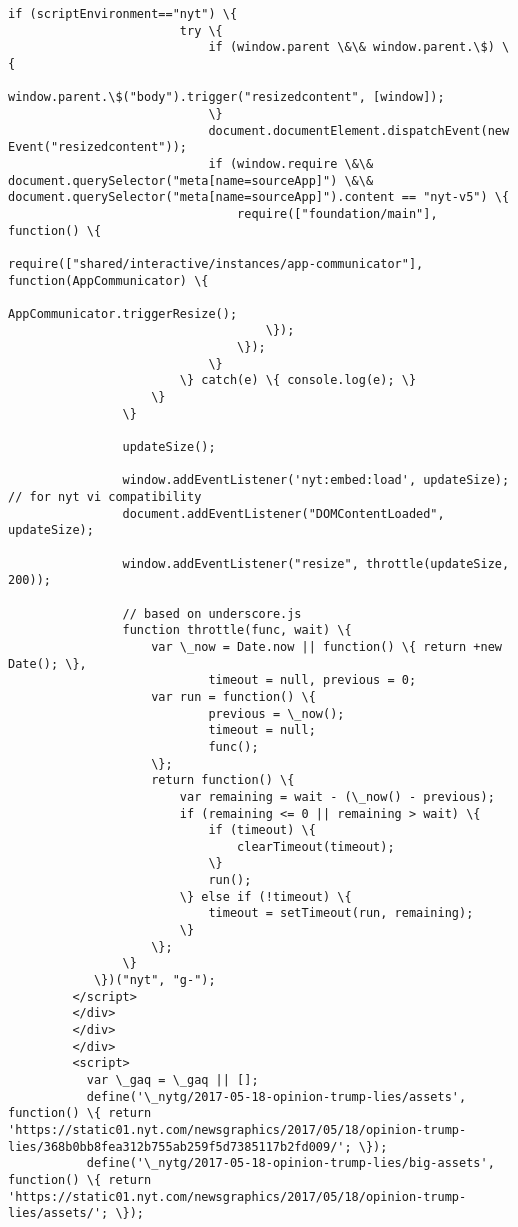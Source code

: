 \documentclass[11pt]{article}
\begin{document}
\begin{Verbatim}[commandchars=\\\{\}]
         			if (scriptEnvironment=="nyt") \{
         				try \{
         					if (window.parent \&\& window.parent.\$) \{
         						window.parent.\$("body").trigger("resizedcontent", [window]);
         					\}
         					document.documentElement.dispatchEvent(new Event("resizedcontent"));
         					if (window.require \&\& document.querySelector("meta[name=sourceApp]") \&\& document.querySelector("meta[name=sourceApp]").content == "nyt-v5") \{
         						require(["foundation/main"], function() \{
         							require(["shared/interactive/instances/app-communicator"], function(AppCommunicator) \{
         								AppCommunicator.triggerResize();
         							\});
         						\});
         					\}
         				\} catch(e) \{ console.log(e); \}
         			\}
         		\}
         
         		updateSize();
         
         		window.addEventListener('nyt:embed:load', updateSize); // for nyt vi compatibility
         		document.addEventListener("DOMContentLoaded", updateSize);
         
         		window.addEventListener("resize", throttle(updateSize, 200));
         
         		// based on underscore.js
         		function throttle(func, wait) \{
         			var \_now = Date.now || function() \{ return +new Date(); \},
         					timeout = null, previous = 0;
         			var run = function() \{
         					previous = \_now();
         					timeout = null;
         					func();
         			\};
         			return function() \{
         				var remaining = wait - (\_now() - previous);
         				if (remaining <= 0 || remaining > wait) \{
         					if (timeout) \{
         						clearTimeout(timeout);
         					\}
         					run();
         				\} else if (!timeout) \{
         					timeout = setTimeout(run, remaining);
         				\}
         			\};
         		\}
         	\})("nyt", "g-");
         </script>
         </div>
         </div>
         </div>
         <script>
           var \_gaq = \_gaq || [];
           define('\_nytg/2017-05-18-opinion-trump-lies/assets', function() \{ return 'https://static01.nyt.com/newsgraphics/2017/05/18/opinion-trump-lies/368b0bb8fea312b755ab259f5d7385117b2fd009/'; \});
           define('\_nytg/2017-05-18-opinion-trump-lies/big-assets', function() \{ return 'https://static01.nyt.com/newsgraphics/2017/05/18/opinion-trump-lies/assets/'; \});
         

\end{Verbatim}
\end{document}
